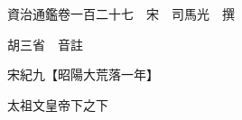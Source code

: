 










 


 
 


 

  
  
  
  
  





  
  
  
  
  
 
  

  

  
  
  



  

 
 

  
   




  

  
  


  　　資治通鑑卷一百二十七　宋　司馬光　撰

　　胡三省　音註

　　宋紀九【昭陽大荒落一年】

　　太祖文皇帝下之下

